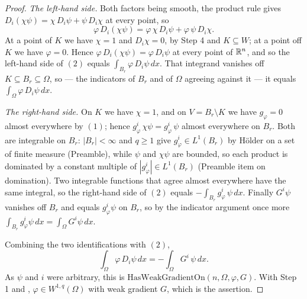 \begin{proof}
\emph{The left-hand side.}  Both factors being smooth, the product rule gives
$D_i(\chi\psi)=\chi\,D_i\psi+\psi\,D_i\chi$ at every point, so
\[
\varphi\,D_i(\chi\psi)=\varphi\,\chi\,D_i\psi+\varphi\,\psi\,D_i\chi .
\]
At a point of $K$ we have $\chi=1$ and $D_i\chi=0$, by Step 4 and
$K\subseteq W$; at a point off $K$ we have $\varphi=0$.  Hence
$\varphi\,D_i(\chi\psi)=\varphi\,D_i\psi$ at every point of $\mathbb{R}^n$, and so the
left-hand side of $(2)$ equals $\int_{B_r}\varphi\,D_i\psi\,dx$.  That integrand
vanishes off $K\subseteq B_r\subseteq\Omega$, so --- the indicators of $B_r$ and
of $\Omega$ agreeing against it --- it equals
$\int_\Omega\varphi\,D_i\psi\,dx$.

\emph{The right-hand side.}  On $K$ we have $\chi=1$, and on
$V=B_r\setminus K$ we have $g_\varphi=0$ almost everywhere by $(1)$; hence
$g_\varphi^i\,\chi\psi=g_\varphi^i\,\psi$ almost everywhere on $B_r$.  Both are
integrable on $B_r$: $|B_r|<\infty$ and $q\ge1$ give
$g_\varphi^i\in L^1(B_r)$ by H\"older on a set of finite measure (Preamble),
while $\psi$ and $\chi\psi$ are bounded, so each product is dominated by a
constant multiple of $|g_\varphi^i|\in L^1(B_r)$ (Preamble item on domination).
Two integrable functions that agree almost everywhere have the same integral, so
the right-hand side of $(2)$ equals $-\int_{B_r}g_\varphi^i\,\psi\,dx$.  Finally
$G^i\psi$ vanishes off $B_r$ and equals $g_\varphi^i\psi$ on $B_r$, so by the
indicator argument once more
$\int_{B_r}g_\varphi^i\psi\,dx=\int_\Omega G^i\psi\,dx$.

Combining the two identifications with $(2)$,
\[
\int_\Omega\varphi\,D_i\psi\,dx=-\int_\Omega G^i\,\psi\,dx .
\]
As $\psi$ and $i$ were arbitrary, this is
$\mathrm{HasWeakGradientOn}(n,\Omega,\varphi,G)$.  With Step 1 and
, $\varphi\in W^{1,q}(\Omega)$ with weak gradient $G$, which is
the assertion.
\end{proof}
